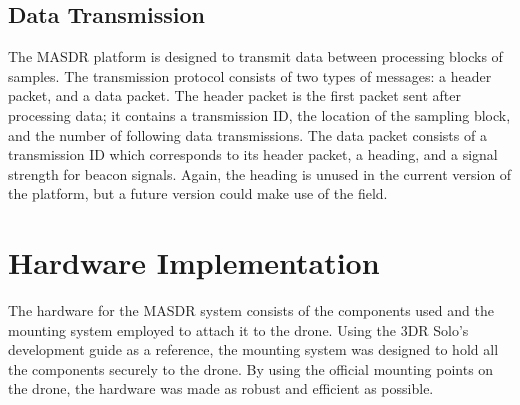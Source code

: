 \subsection{Data Transmission} \label{impl:tx_messages}
The MASDR platform is designed to transmit data between processing blocks of samples. The transmission protocol consists of two types of messages: a header packet, and a data packet. The header packet is the first packet sent after processing data; it contains a transmission ID, the location of the sampling block, and the number of following data transmissions. The data packet consists of a transmission ID which corresponds to its header packet, a heading, and a signal strength for beacon signals. Again, the heading is unused in the current version of the platform, but a future version could make use of the field.

\section{Hardware Implementation}
The hardware for the MASDR system consists of the components used and the mounting system employed to attach it to the drone. Using the 3DR Solo’s development guide as a reference, the mounting system was designed to hold all the components securely to the drone. By using the official mounting points on the drone, the hardware was made as robust and efficient as possible.
